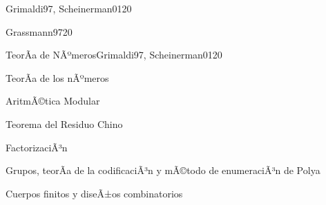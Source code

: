\begin{syllabus}
\begin{unit}{\ALNUEVEDef}{Grimaldi97, Scheinerman01}{20}
   \begin{topics}
         \item  \ALNUEVEDef
         \item  \ALNUEVETopicRevision
         \item  \ALNUEVETopicCriptografia
        \item   \ALNUEVETopicCriptografiade
        \item   \ALNUEVETopicFirmas
        \item   \ALNUEVETopicProtocolos
        \item   \ALNUEVETopicAplicaciones
   \end{topics}

   \begin{unitgoals}
         \item \ALNUEVEObjONE
         \item \ALNUEVEObjTWO
          \item \ALNUEVEObjTHREE
   \end{unitgoals}
\end{unit}

\begin{unit}{\IMFOURDef}{Grassmann97}{20}
   \begin{topics}
         \item \IMFOURDef
         \item \IMFOURTopicMapeo
         \item \IMFOURTopicEntidad
         \item \IMFOURTopicAlgebra
   \end{topics}

   \begin{unitgoals}
         \item \IMFOURObjONE
         \item \IMFOURObjTWO
         \item \IMFOURObjTHREE
         \item \IMFOURObjFOUR
         \item \IMFOURObjCINCO
   \end{unitgoals}
\end{unit}

\begin{unit}{TeorÃ­a de NÃºmeros}{Grimaldi97, Scheinerman01}{20}
   \begin{topics}
      \item TeorÃ­a de los nÃºmeros
     \item AritmÃ©tica  Modular
      \item Teorema del Residuo Chino
       \item FactorizaciÃ³n
      \item Grupos, teorÃ­a de la codificaciÃ³n y mÃ©todo de enumeraciÃ³n de Polya
      \item Cuerpos finitos y diseÃ±os combinatorios
   \end{topics}


\end{unit}
\end{syllabus}
